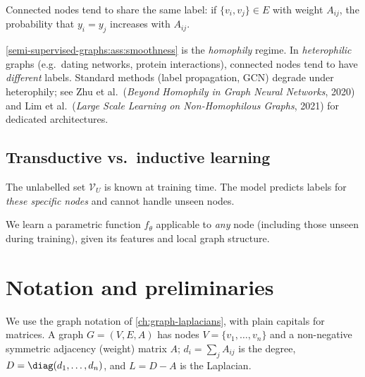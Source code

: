 \begin{notechapter}
\begin{assumption}
\label{semi-supervised-graphs:ass:smoothness}
Connected nodes tend to share the same label: if $\{v_i, v_j\} \in E$ with
weight $A_{ij}$, the probability that $y_i = y_j$ increases with $A_{ij}$.
\end{assumption}

\begin{remark}
\label{semi-supervised-graphs:rem:heterophily}
\cref{semi-supervised-graphs:ass:smoothness} is the \emph{homophily} regime. In
\emph{heterophilic} graphs (e.g.\ dating networks, protein interactions),
connected nodes tend to have \emph{different} labels. Standard methods (label
propagation, GCN) degrade under heterophily; see Zhu et al.\ (\emph{Beyond Homophily in Graph Neural Networks}, 2020) and Lim et al.\ (\emph{Large Scale Learning on Non-Homophilous Graphs}, 2021) for dedicated architectures.
\end{remark}

\subsection{Transductive vs.\ inductive learning}

\begin{definition}
The unlabelled set $\mathcal{V}_U$ is known at training time. The model
predicts labels for \emph{these specific nodes} and cannot handle unseen nodes.
\end{definition}

\begin{definition}
We learn a parametric function $f_\theta$ applicable to \emph{any} node
(including those unseen during training), given its features and local graph
structure.
\end{definition}

\section{Notation and preliminaries}
\label{semi-supervised-graphs:sec:prelim}

We use the graph notation of \cref{ch:graph-laplacians}, with plain capitals for matrices. A graph $G = (V, E, A)$ has nodes $V = \{v_1, \ldots, v_n\}$ and a non-negative symmetric adjacency (weight) matrix $A$; $d_i = \sum_jA_{ij}$ is the degree, $D = \diag(d_1, \ldots, d_n)$, and $L = D - A$ is the Laplacian.


\end{notechapter}
